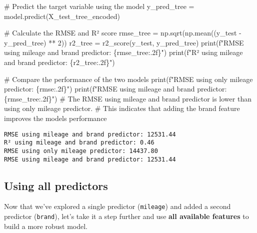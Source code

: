 \documentclass[
  letterpaper,
  DIV=11,
  numbers=noendperiod]{scrreprt}
\newenvironment{Shaded}{\begin{snugshade}}{\end{snugshade}}
\newcommand{\BuiltInTok}[1]{\textcolor[rgb]{0.00,0.23,0.31}{#1}}
\newcommand{\CommentTok}[1]{\textcolor[rgb]{0.37,0.37,0.37}{#1}}
\newcommand{\DecValTok}[1]{\textcolor[rgb]{0.68,0.00,0.00}{#1}}
\newcommand{\NormalTok}[1]{\textcolor[rgb]{0.00,0.23,0.31}{#1}}
\newcommand{\OperatorTok}[1]{\textcolor[rgb]{0.37,0.37,0.37}{#1}}
\newcommand{\SpecialCharTok}[1]{\textcolor[rgb]{0.37,0.37,0.37}{#1}}
\newcommand{\SpecialStringTok}[1]{\textcolor[rgb]{0.13,0.47,0.30}{#1}}
\begin{document}
\begin{Shaded}
\begin{Highlighting}[]
\CommentTok{\# Predict the target variable using the model}
\NormalTok{y\_pred\_tree }\OperatorTok{=}\NormalTok{ model.predict(X\_test\_tree\_encoded)}

\CommentTok{\# Calculate the RMSE and R² score}
\NormalTok{rmse\_tree }\OperatorTok{=}\NormalTok{ np.sqrt(np.mean((y\_test }\OperatorTok{{-}}\NormalTok{ y\_pred\_tree) }\OperatorTok{**} \DecValTok{2}\NormalTok{))}
\NormalTok{r2\_tree }\OperatorTok{=}\NormalTok{ r2\_score(y\_test, y\_pred\_tree)}
\BuiltInTok{print}\NormalTok{(}\SpecialStringTok{f"RMSE using mileage and brand predictor: }\SpecialCharTok{\{}\NormalTok{rmse\_tree}\SpecialCharTok{:.2f\}}\SpecialStringTok{"}\NormalTok{)}
\BuiltInTok{print}\NormalTok{(}\SpecialStringTok{f"R² using mileage and brand predictor: }\SpecialCharTok{\{}\NormalTok{r2\_tree}\SpecialCharTok{:.2f\}}\SpecialStringTok{"}\NormalTok{)}

\CommentTok{\# Compare the performance of the two models}
\BuiltInTok{print}\NormalTok{(}\SpecialStringTok{f"RMSE using only mileage predictor: }\SpecialCharTok{\{}\NormalTok{rmse}\SpecialCharTok{:.2f\}}\SpecialStringTok{"}\NormalTok{)}
\BuiltInTok{print}\NormalTok{(}\SpecialStringTok{f"RMSE using mileage and brand predictor: }\SpecialCharTok{\{}\NormalTok{rmse\_tree}\SpecialCharTok{:.2f\}}\SpecialStringTok{"}\NormalTok{)}
\CommentTok{\# The RMSE using mileage and brand predictor is lower than using only mileage predictor.}
\CommentTok{\# This indicates that adding the brand feature improves the model\textquotesingle{}s performance}
\end{Highlighting}
\end{Shaded}

\begin{verbatim}
RMSE using mileage and brand predictor: 12531.44
R² using mileage and brand predictor: 0.46
RMSE using only mileage predictor: 14437.80
RMSE using mileage and brand predictor: 12531.44
\end{verbatim}

\subsection{Using all predictors}\label{using-all-predictors}

Now that we've explored a single predictor (\texttt{mileage}) and added
a second predictor (\texttt{brand}), let's take it a step further and
use \textbf{all available features} to build a more robust model.
\end{document}
